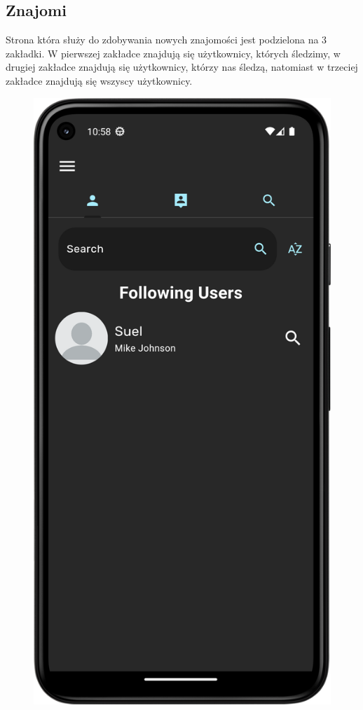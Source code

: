 \documentclass[a4paper,twoside,12pt]{book}
\begin{document}
\subsection{Znajomi}
Strona która służy do zdobywania nowych znajomości jest podzielona na 3 zakładki. W pierwszej zakładce znajdują się użytkownicy, których śledzimy, w drugiej zakładce znajdują się użytkownicy, którzy nas śledzą, natomiast w trzeciej zakładce znajdują się wszyscy użytkownicy. 

\begin{figure}[H]
  \centering
  \begin{minipage}[b]{0.30\textwidth}
    \includegraphics[width=\textwidth]{mobile_ss/followani.png}

\end{minipage}
\end{figure}
\end{document}
